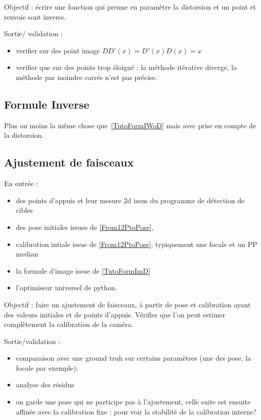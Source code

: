 Objectif : écrire une fonction qui prenne en paramètre la distorsion 
et un point et renvoie sont inverse.


Sortie/ validation :
\begin{itemize}
	\item  verifier sur des point image $D D'(x) = D'(x) D(x) = x $
	\item  verifier que sur des points trop éloigné : la méthode itérative diverge,
		la méthode par moindre carrés n'est pas précise.
\end{itemize}


\subsection{Formule Inverse}
\label{TutoFormIDist}

Plus ou moins la même chose que~\ref{TutoFormIWoD} mais avec prise en compte de la distorsion.



\subsection{Ajustement de faisceaux}

\label{TutoBundleGCP}
En entrée :

\begin{itemize}
      \item  des points d'appuis et leur mesure 2d issus du programme de détection de cibles
      \item  des pose initiales issues de \ref{From12PtoPose}, 
      \item  calibration intiale issue  de \ref{From12PtoPose},  typiquement une focale
             et un PP median
      \item  la formule d'image issue de \ref{TutoFormImD}
      \item  l'optimiseur universel de python.
\end{itemize}

Objectif : faire un ajustement de faisceaux, à partir de pose et calibration ayant des
valeurs initiales et de points d'appuis. Vérifier  que l'on peut estimer complètement la
calibration de la caméra.


Sortie/validation :

\begin{itemize}
      \item  comparaison avec une ground truh  sur certains paramètres
	      (une des pose, la focale par exemple);

      \item  analyse des résidus

       \item on garde une pose qui ne participe pas à l'ajustement,
             celle suite est ensuite affinée avec la calibration fixe :
             pour voir la stabilité de la calibration interne?
\end{itemize}

